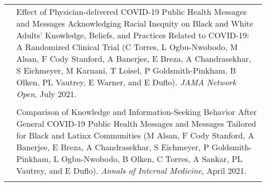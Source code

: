 \documentclass[letterpaper,11pt]{article}
\begin{document}
\begin{footnotesize}
{\begin{tabularx}{\linewidth}{@{}
    >{\raggedright\arraybackslash\hsize=0.266\hsize}X 
    >{\raggedright\arraybackslash\hsize=1.733\hsize}X
  }
       & Effect of Physician-delivered COVID-19 Public Health Messages and Messages Acknowledging Racial Inequity on Black and White Adults' Knowledge, Beliefs, and Practices Related to COVID-19: A Randomized Clinical Trial (C Torres, L Ogbu-Nwobodo, M Alsan, F Cody Stanford, A Banerjee, E Breza, A Chandrasekhar, S Eichmeyer, M Karnani, T Loisel, P Goldsmith-Pinkham, B Olken, PL Vautrey, E Warner, and E Duflo).   \textit{JAMA Network Open}, July 2021.  \\
&  \\
& Comparison of Knowledge and Information-Seeking Behavior After General COVID-19 Public Health Messages and Messages Tailored for Black and Latinx Communities (M Alsan, F Cody Stanford, A Banerjee, E Breza, A Chandrasekhar, S Eichmeyer, P Goldsmith-Pinkham, L Ogbu-Nwobodo, B Olken, C Torres, A Sankar, PL Vautrey, and E Duflo).  \textit{Annals of Internal Medicine}, April 2021.  \\
&
\end{tabularx}
 }
 \vspace{-0.2cm}

\noindent
{ %

}
\end{footnotesize}
\end{document}
